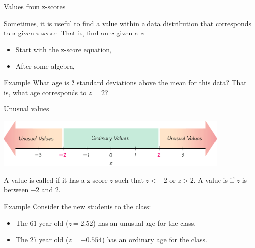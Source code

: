 \documentclass[xcolor=table, aspectratio=169, bigger, handout]{beamer}
\begin{document}
\begin{frame}{Values from z-scores}
\begin{block}{}
Sometimes, it is useful to find a value within a data distribution that corresponds to a given z-score. That is, find an $x$ given a $z$. 
\medskip
\begin{itemize}
\pause\item Start with the z-score equation, \\
\smallskip
{}
\pause\item After some algebra,\\
\smallskip
{}
\end{itemize}
\end{block}

\pause
\begin{exampleblock}{Example}
What age is 2 standard deviations above the mean for this data? That is, what age corresponds to $z=2$?\\
\smallskip
\pause
{}
\end{exampleblock}
\end{frame}

\begin{frame}{Unusual values}

{\centering
\includegraphics[width=4.5in]{../images/ch03_unusual} \par
}

\begin{block}{}
A value is called  if it has a z-score $z$ such that $z< -2$ or $z > 2$. A value is  if $z$ is between $-2$ and $2$.
\end{block}

\pause
\begin{exampleblock}{Example}
Consider the new students to the class:
\begin{itemize}
\item The 61 year old ($z=2.52$) has an unusual age for the class. 
\item The 27 year old ($z=-0.554$) has an ordinary age for the class.
\end{itemize}
\end{exampleblock}
\end{frame}
\end{document}
